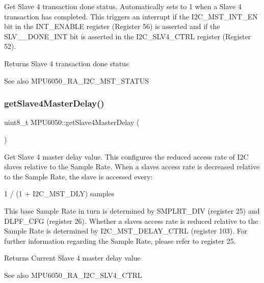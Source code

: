 Get Slave 4 transaction done status. Automatically sets to 1 when a Slave 4 transaction has completed. This triggers an interrupt if the I2\+C\+\_\+\+M\+S\+T\+\_\+\+I\+N\+T\+\_\+\+EN bit in the I\+N\+T\+\_\+\+E\+N\+A\+B\+LE register (Register 56) is asserted and if the S\+L\+V\+\_\+\_\+\+D\+O\+N\+E\+\_\+\+I\+NT bit is asserted in the I2\+C\+\_\+\+S\+L\+V4\+\_\+\+C\+T\+RL register (Register 52). \begin{DoxyReturn}{Returns}
Slave 4 transaction done status 
\end{DoxyReturn}
\begin{DoxySeeAlso}{See also}
M\+P\+U6050\+\_\+\+R\+A\+\_\+\+I2\+C\+\_\+\+M\+S\+T\+\_\+\+S\+T\+A\+T\+US 
\end{DoxySeeAlso}
\mbox{\label{class_m_p_u6050_a9a4585b3c9e61478db198011107a56a9}} 
\subsubsection{\texorpdfstring{getSlave4MasterDelay()}{getSlave4MasterDelay()}}
{\footnotesize\ttfamily uint8\+\_\+t M\+P\+U6050\+::get\+Slave4\+Master\+Delay (\begin{DoxyParamCaption}{ }\end{DoxyParamCaption})}

Get Slave 4 master delay value. This configures the reduced access rate of I2C slaves relative to the Sample Rate. When a slave\textquotesingle{}s access rate is decreased relative to the Sample Rate, the slave is accessed every\+: \begin{DoxyVerb}1 / (1 + I2C_MST_DLY) samples
\end{DoxyVerb}


This base Sample Rate in turn is determined by S\+M\+P\+L\+R\+T\+\_\+\+D\+IV (register 25) and D\+L\+P\+F\+\_\+\+C\+FG (register 26). Whether a slave\textquotesingle{}s access rate is reduced relative to the Sample Rate is determined by I2\+C\+\_\+\+M\+S\+T\+\_\+\+D\+E\+L\+A\+Y\+\_\+\+C\+T\+RL (register 103). For further information regarding the Sample Rate, please refer to register 25.

\begin{DoxyReturn}{Returns}
Current Slave 4 master delay value 
\end{DoxyReturn}
\begin{DoxySeeAlso}{See also}
M\+P\+U6050\+\_\+\+R\+A\+\_\+\+I2\+C\+\_\+\+S\+L\+V4\+\_\+\+C\+T\+RL 
\end{DoxySeeAlso}
\mbox{\label{class_m_p_u6050_ae9882b425cbdced4de325b608d896e10}} 
